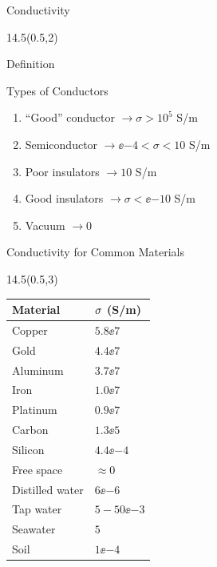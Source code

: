 \begin{frame}{Conductivity}
\begin{textblock}{14.5}(0.5,2)
\begin{myblock}[0.9]{Definition}
\vspace{-16pt}
\vspace{-18pt}
\end{myblock}
\vspace{-18pt}
\begin{myblock}[0.9]{Types of Conductors}
	\begin{enumerate}
		\item ``Good'' conductor $\longrightarrow \sigma > 10^5$ S/m
		\item Semiconductor $\longrightarrow\ee{-4} < \sigma < 10$ S/m
		\item Poor insulators $\longrightarrow 10$ S/m
		\item Good insulators $\longrightarrow \sigma < \ee{-10}$ S/m
		\item Vacuum $\longrightarrow 0$
	\end{enumerate}
\end{myblock}
\end{textblock}
\end{frame}

\begin{frame}{Conductivity for Common Materials}
\begin{textblock}{14.5}(0.5,3)
\begin{center}
\begin{tabular}{| l | l |}
		\hline
		\textbf{Material}  & $\boldmath{\sigma}$ (S/m) \\ \hline\hline
		Copper	& $5.8\ee{7}$\\ \hline
		Gold 	& $4.4\ee{7}$ \\ \hline
		Aluminum & $3.7\ee{7} $\\ \hline
 		Iron	& $1.0\ee{7}$ \\ \hline
		Platinum	& $0.9\ee{7}$ \\ \hline
		Carbon	& $1.3\ee{5}$ \\ \hline
		Silicon	& $4.4\ee{-4}$ \\ \hline
		Free space	& $\approx 0$\\ \hline
		Distilled water	& $6\ee{-6}$ \\ \hline
		Tap water	& $5-50\ee{-3}$ \\ \hline
		Seawater	& $5$\\ \hline
		Soil			& $1\ee{-4}$  \\ \hline
\end{tabular}
\end{center}
\end{textblock}
\end{frame}


